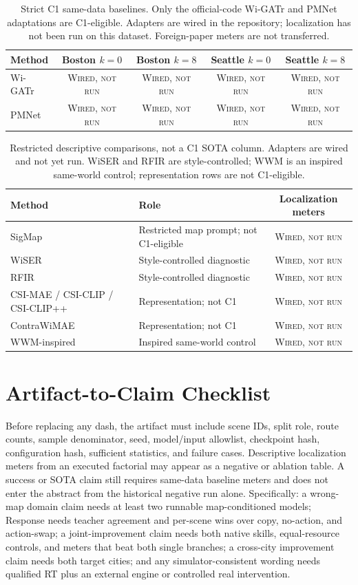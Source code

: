\documentclass{article}
\newcommand{\wired}{\textsc{Wired, not run}}
\begin{document}
\begin{table}[h]
\caption{Strict C1 same-data baselines.  Only the official-code Wi-GATr
and PMNet adaptations are C1-eligible.  Adapters are wired in the
repository; localization has not been run on this dataset.
Foreign-paper meters are not transferred.}
\label{tab:c1-baselines}
\centering
\small
\begin{tabular}{lcccc}
\toprule
Method & Boston $k=0$ & Boston $k=8$ & Seattle $k=0$ & Seattle $k=8$ \\
\midrule
Wi-GATr & \wired & \wired & \wired & \wired \\
PMNet & \wired & \wired & \wired & \wired \\
\bottomrule
\end{tabular}
\end{table}

\begin{table}[h]
\caption{Restricted descriptive comparisons, not a C1 SOTA column.
Adapters are wired and not yet run.  WiSER and RFIR are
style-controlled; WWM is an inspired same-world control; representation
rows are not C1-eligible.}
\label{tab:restricted-baselines}
\centering
\small
\begin{tabular}{llc}
\toprule
Method & Role & Localization meters \\
\midrule
SigMap & Restricted map prompt; not C1-eligible & \wired \\
WiSER & Style-controlled diagnostic & \wired \\
RFIR & Style-controlled diagnostic & \wired \\
CSI-MAE / CSI-CLIP / CSI-CLIP++ & Representation; not C1 & \wired \\
ContraWiMAE & Representation; not C1 & \wired \\
WWM-inspired & Inspired same-world control & \wired \\
\bottomrule
\end{tabular}
\end{table}

\section{Artifact-to-Claim Checklist}

Before replacing any dash, the artifact must include scene IDs, split role,
route counts, sample denominator, seed, model/input allowlist, checkpoint hash,
configuration hash, sufficient statistics, and failure cases.  Descriptive
localization meters from an executed factorial may appear as a negative or
ablation table.  A success or SOTA claim still requires same-data baseline
meters and does not enter the abstract from the historical negative run
alone.  Specifically: a
wrong-map domain claim needs at least two runnable map-conditioned models;
Response needs teacher agreement and per-scene wins over copy, no-action, and
action-swap; a joint-improvement claim needs both native skills, equal-resource
controls, and meters that beat both single branches; a cross-city improvement
claim needs both target cities; and any simulator-consistent wording needs
qualified RT plus an external engine or controlled real intervention.
\end{document}
